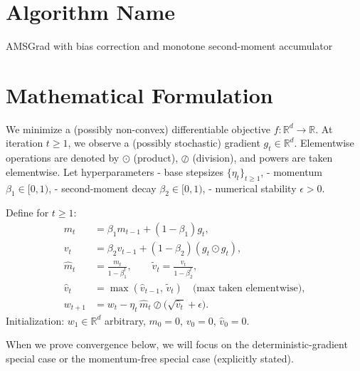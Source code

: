 \documentclass[11pt]{article}
\newcommand{\R}{\mathbb{R}}
\begin{document}
\section*{Algorithm Name}
AMSGrad with bias correction and monotone second-moment accumulator

\section*{Mathematical Formulation}
We minimize a (possibly non-convex) differentiable objective $f:\R^d\to\R$.
At iteration $t\ge 1$, we observe a (possibly stochastic) gradient $g_t\in\R^d$.
Elementwise operations are denoted by $\odot$ (product), $\oslash$ (division), and powers are taken elementwise. Let hyperparameters
- base stepsizes $\{\eta_t\}_{t\ge 1}$,
- momentum $\beta_1\in[0,1)$,
- second-moment decay $\beta_2\in[0,1)$,
- numerical stability $\epsilon>0$.

Define for $t\ge 1$:
\[
\begin{aligned}
m_t &= \beta_1 m_{t-1} + (1-\beta_1) g_t, \\
v_t &= \beta_2 v_{t-1} + (1-\beta_2) (g_t \odot g_t), \\
\hat m_t &= \frac{m_t}{1-\beta_1^t},\qquad \tilde v_t = \frac{v_t}{1-\beta_2^t},\\
\hat v_t &= \max(\hat v_{t-1},\, \tilde v_t)\quad\text{(max taken elementwise)},\\
w_{t+1} &= w_t - \eta_t\, \hat m_t \oslash \big(\sqrt{\hat v_t} + \epsilon\big).
\end{aligned}
\]
Initialization: $w_1\in\R^d$ arbitrary, $m_0=0$, $v_0=0$, $\hat v_0=0$.

When we prove convergence below, we will focus on the deterministic-gradient special case or the momentum-free special case (explicitly stated).
\end{document}
